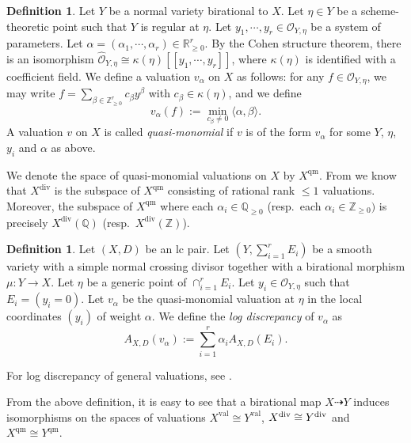 \documentclass[reqno, 12pt]{amsart}
\theoremstyle{definition}
\newtheorem{defn}[prop]{Definition}
\newcommand{\bR}{\mathbb{R}}
\newcommand{\bQ}{\mathbb{Q}}
\newcommand{\bZ}{\mathbb{Z}}
\newcommand{\cO}{\mathcal{O}}
\newcommand{\val}{\mathrm{val}}
\newcommand{\qm}{\mathrm{qm}}
\newcommand{\rdiv}{\mathrm{div}}
\numberwithin{equation}{section}
\begin{document}
\begin{defn}
Let $Y$ be a normal variety birational to $X$. Let $\eta\in Y$ be a scheme-theoretic point such that $Y$ is regular at $\eta$. Let $y_1,\cdots, y_r\in \cO_{Y, \eta}$ be a system of parameters. Let $\alpha = (\alpha_1, \cdots, \alpha_r)\in \bR_{\geq 0}^r$.
By the Cohen structure theorem, there is an isomorphism
$\widehat{\mathcal O}_{Y,\eta}
\cong
\kappa(\eta)[[y_1,\cdots,y_r]]$,
where $\kappa(\eta)$ is identified with a coefficient field.
We define a valuation $v_\alpha$ on $X$ as follows: for any $f\in \cO_{Y,\eta}$, we may write $f = \sum_{\beta\in \bZ_{\geq 0}^r} c_{\beta} y^{\beta}$ with $c_{\beta}\in \kappa(\eta)$, and we define
\[
v_{\alpha}(f) := \min_{c_{\beta}\neq 0}\langle \alpha, \beta\rangle. 
\]
A valuation $v$ on $X$ is called \emph{quasi-monomial} if $v$ is of the form $v_{\alpha}$ for some $Y$, $\eta$, $y_i$ and $\alpha$ as above.

We denote the space of quasi-monomial valuations on $X$ by $X^{\qm}$.  From \cite[Remark 3.9]{JM12} we know that $X^{\rdiv}$ is the subspace of $X^{\qm}$ consisting of rational rank $\leq 1$ valuations. Moreover, the subspace of $X^{\qm}$ where each $\alpha_i\in \bQ_{\geq 0}$ (resp.\ each $\alpha_i\in \bZ_{\geq 0})$ is precisely $X^{\rdiv}(\bQ)$ (resp.\ $X^{\rdiv}(\bZ)$).
\end{defn}

\begin{defn}
Let $(X,D)$ be an lc pair. Let $(Y, \sum_{i=1}^{r} E_i)$ be a smooth variety with a simple normal crossing divisor together with a birational morphism $\mu: Y\to X$. Let $\eta$ be a generic point of $\cap_{i=1}^r E_i$. Let $y_i\in \cO_{Y,\eta}$ such that $E_i  = (y_i = 0)$. Let $v_{\alpha}$ be the quasi-monomial valuation at $\eta$ in the local coordinates $(y_i)$ of weight $\alpha$.  We define the \emph{log discrepancy} of $v_{\alpha}$ as
\[
A_{X,D}(v_{\alpha}):= \sum_{i=1}^r \alpha_i A_{X,D}(E_i).
\]
\end{defn}

For log discrepancy of general valuations, see \cite{JM12, BdFFU15}.

From the above definition, it is easy to see that a birational map $X\dashrightarrow Y$ induces isomorphisms on the spaces of valuations $X^{\val} \cong Y^{\val}$, $X^{\rm div} \cong Y^{\rm div}$ and $X^{\qm} \cong Y^{\qm}$.
\end{document}
